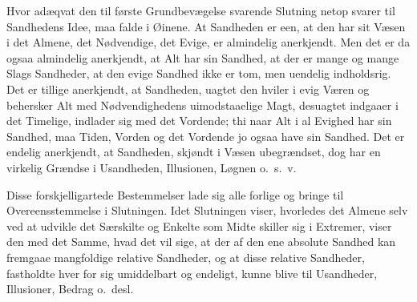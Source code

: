 \documentclass[12pt]{book}
\newcommand{\opage}[1]{\marginnote{\footnotesize\textit{[#1]}}}
\begin{document}
Hvor adæqvat den til første Grundbevægelse svarende Slutning netop svarer til Sandhedens Idee, maa falde i Øinene. At Sandheden er een, at den har sit Væsen i det Almene, det Nødvendige, det Evige, er almindelig anerkjendt. Men det er da ogsaa almindelig anerkjendt, at Alt har sin Sandhed, at der er mange og mange Slags Sandheder, at den evige Sandhed ikke er tom, men uendelig indholdsrig. Det er tillige anerkjendt, at Sandheden, uagtet den hviler i evig Væren og behersker Alt med Nødvendighedens uimodstaaelige Magt, desuagtet indgaaer i det Timelige, indlader sig med det Vordende; thi naar Alt i al Evighed har sin Sandhed, maa Tiden, Vorden og det Vordende jo ogsaa have sin Sandhed. Det er endelig anerkjendt, at Sandheden,
\opage{370}skjøndt i Væsen ubegrændset, dog har en virkelig Grændse i Usandheden, Illusionen, Løgnen o.~s.~v.

Disse forskjelligartede Bestemmelser lade sig alle forlige og bringe til Overeensstemmelse i Slutningen. Idet Slutningen viser, hvorledes det Almene selv ved at udvikle det Særskilte og Enkelte som Midte skiller sig i Extremer, viser den med det Samme, hvad det vil sige, at der af den ene absolute Sandhed kan fremgaae mangfoldige relative Sandheder, og at disse relative Sandheder, fastholdte hver for sig umiddelbart og endeligt, kunne blive til Usandheder, Illusioner, Bedrag o.~desl.
\end{document}
